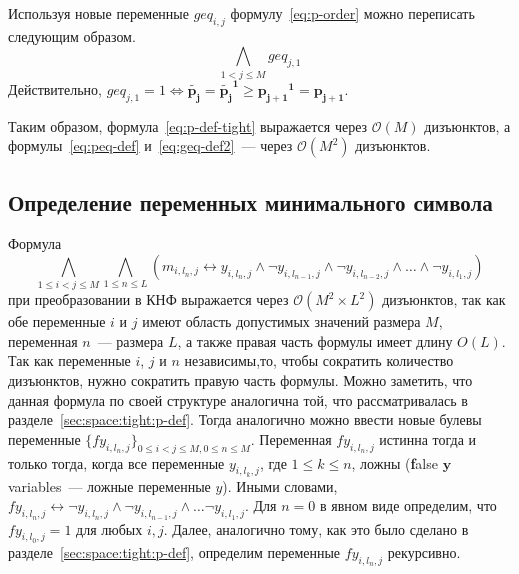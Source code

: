 Используя новые переменные $\mathit{geq}_{i,j}$ формулу~\eqref{eq:p-order} можно переписать следующим образом.
%
\begin{equation}
\label{eq:p-order-tight}
  \bigwedge_{1 < j \leq M} \mathit{geq}_{j,1}
\end{equation}
%
Действительно, $\mathit{geq}_{j,1} = 1 \Leftrightarrow \tilde{\mathbf{p_{j}}} = \tilde{\mathbf{p_{j}}}^\mathbf{1} \geq \mathbf{p_{j + 1}}^{\mathbf{1}} = \mathbf{p_{j + 1}}$.

Таким образом, формула~\eqref{eq:p-def-tight} выражается через $\mathcal{O}\left(M\right)$ дизъюнктов, а формулы~\eqref{eq:peq-def} и~\eqref{eq:geq-def2}~{---} через $\mathcal{O}\left(M^{2}\right)$ дизъюнктов.


\subsection{Определение переменных минимального символа}
\label{sec:space:tight:m-def}

Формула
\begin{equation*}
\bigwedge_{1 \leq i < j \leq M} \bigwedge_{1 \leq n \leq L} \left(m_{i,l_{n},j} \leftrightarrow y_{i,l_{n},j} \wedge \neg y_{i,l_{n - 1}, j} \wedge \neg y_{i,l_{n - 2}, j} \wedge \ldots \wedge \neg y_{i,l_{1},j} \right)
\end{equation*}
при преобразовании в КНФ выражается через $\mathcal{O}\left(M^{2} \times L^{2}\right)$ дизъюнктов, так как обе переменные $i$ и $j$ имеют область допустимых значений размера $M$, переменная $n$~{---} размера $L$, а также правая часть формулы имеет длину $O\left(L\right)$.
Так как переменные $i$, $j$ и $n$ независимы,то, чтобы сократить количество дизъюнктов, нужно сократить правую часть формулы.
Можно заметить, что данная формула по своей структуре аналогична той, что рассматривалась в разделе~\ref{sec:space:tight:p-def}.
Тогда аналогично можно ввести новые булевы переменные $\{\mathit{fy}_{i,l_{n},j}\}_{0 \leq i < j \leq M,0 \leq n \leq M}$.
Переменная $\mathit{fy}_{i,l_{n},j}$ истинна тогда и только тогда, когда все переменные $y_{i,l_{k},j}$, где $1 \leq k \leq n$, ложны (\textbf{f}alse $\boldsymbol{y}$ variables~{---} ложные переменные $y$).
Иными словами, $\mathit{fy}_{i,l_{n},j} \leftrightarrow \neg y_{i,l_{n},j} \wedge \neg y_{i, l_{n - 1}, j} \wedge \ldots \neg y_{i,l_{1},j}$. 
Для $n = 0$ в явном виде определим, что $\mathit{fy}_{i,l_{0},j} = 1$ для любых $i,j$.
Далее, аналогично тому, как это было сделано в разделе~\ref{sec:space:tight:p-def}, определим переменные $\mathit{fy}_{i,l_{n},j}$ рекурсивно.

